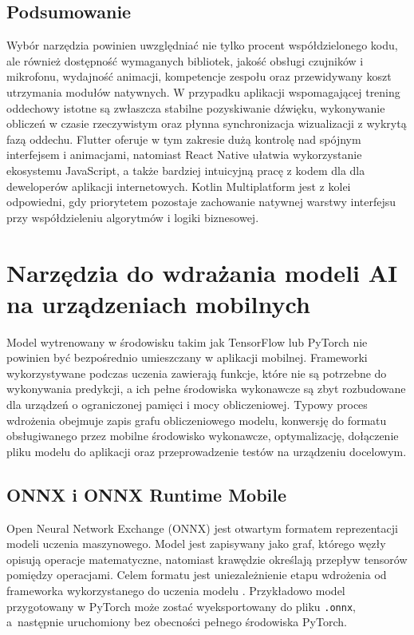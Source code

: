 \subsection{Podsumowanie}
Wybór narzędzia powinien uwzględniać nie tylko procent współdzielonego kodu, ale również dostępność wymaganych bibliotek, jakość obsługi czujników i mikrofonu, wydajność animacji, kompetencje zespołu oraz przewidywany koszt utrzymania modułów natywnych. W przypadku aplikacji wspomagającej trening oddechowy istotne są zwłaszcza stabilne pozyskiwanie dźwięku, wykonywanie obliczeń w czasie rzeczywistym oraz płynna synchronizacja wizualizacji z wykrytą fazą oddechu. Flutter oferuje w tym zakresie dużą kontrolę nad spójnym interfejsem i animacjami, natomiast React Native ułatwia wykorzystanie ekosystemu JavaScript, a także bardziej intuicyjną pracę z kodem dla dla deweloperów aplikacji internetowych. Kotlin Multiplatform jest z kolei odpowiedni, gdy priorytetem pozostaje zachowanie natywnej warstwy interfejsu przy współdzieleniu algorytmów i logiki biznesowej.

\section{Narzędzia do wdrażania modeli AI na urządzeniach mobilnych}

Model wytrenowany w środowisku takim jak TensorFlow lub PyTorch nie powinien być bezpośrednio umieszczany w aplikacji mobilnej. Frameworki wykorzystywane podczas uczenia zawierają funkcje, które nie są potrzebne do wykonywania predykcji, a ich pełne środowiska wykonawcze są zbyt rozbudowane dla urządzeń o ograniczonej pamięci i mocy obliczeniowej. Typowy proces wdrożenia obejmuje zapis grafu obliczeniowego modelu, konwersję do formatu obsługiwanego przez mobilne środowisko wykonawcze, optymalizację, dołączenie pliku modelu do aplikacji oraz przeprowadzenie testów na urządzeniu docelowym.

\subsection{ONNX i ONNX Runtime Mobile}

Open Neural Network Exchange (ONNX) jest otwartym formatem reprezentacji modeli uczenia maszynowego. Model jest zapisywany jako graf, którego węzły opisują operacje matematyczne, natomiast krawędzie określają przepływ tensorów pomiędzy operacjami. Celem formatu jest uniezależnienie etapu wdrożenia od frameworka wykorzystanego do uczenia modelu \cite{onnxConcepts2026}. Przykładowo model przygotowany w PyTorch może zostać wyeksportowany do pliku \texttt{.onnx}, a~następnie uruchomiony bez obecności pełnego środowiska PyTorch.

